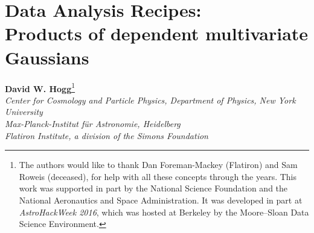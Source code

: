 \newcommand{\given}{\,|\,}
\newcommand{\dd}{\mathrm{d}}
\newcommand{\T}{^{\!\mathsf{T}\!}}
\newcommand{\inv}{^{-1}}
\newcommand{\scalar}[1]{#1}
\renewcommand{\vector}[1]{\boldsymbol{#1}}
\newcommand{\tensor}[1]{\mathbf{#1}}
\renewcommand{\matrix}[1]{\mathsf{#1}}
\newcommand{\normal}{\mathcal{N}\!\,}

\newcommand{\va}{\vector{a}}
\newcommand{\vb}{\vector{b}}
\newcommand{\vm}{\vector{m}}
\newcommand{\vx}{\vector{x}}
\newcommand{\vy}{\vector{y}}
\newcommand{\vz}{\vector{z}}
\newcommand{\vmu}{\vector{\mu}}
\newcommand{\veta}{\vector{\eta}}
\newcommand{\vtheta}{\vector{\theta}}
\newcommand{\tA}{\tensor{A}}
\newcommand{\tB}{\tensor{B}}
\newcommand{\tC}{\tensor{C}}
\newcommand{\tD}{\tensor{D}}
\newcommand{\tI}{\tensor{I}}
\newcommand{\tQ}{\tensor{Q}}
\newcommand{\tS}{\tensor{S}}
\newcommand{\tH}{\tensor{H}}
\newcommand{\tV}{\tensor{V}}
\newcommand{\tLambda}{\tensor{\Lambda}}
\newcommand{\mM}{\matrix{M}}
\newcommand{\mN}{\matrix{N}}
\newcommand{\mU}{\matrix{U}}
\newcommand{\mV}{\matrix{V}}
\newcommand{\bP}{\ensuremath{\textrm{\ding{80}}}} %
\newcommand{\bH}{\ensuremath{\textrm{\ding{114}}}} %

\addtolength{\topmargin}{-0.75in}
\addtolength{\textheight}{1.5in}
\setlength{\parindent}{\baselineskip}
\raggedbottom\sloppy\sloppypar\frenchspacing

\usepackage{color}
\newcommand{\todo}[1]{\textcolor{BrickRed}{[TODO: #1]}}
\newcommand{\bl}[1]{\textcolor{red}{[BL says: #1]}}
\newcommand{\hogg}[1]{\textcolor{magenta}{[Hogg says: #1]}}



\section*{Data Analysis Recipes:\\ Products of dependent multivariate Gaussians}

\noindent\textbf{David W. Hogg}\footnote{%
The authors would like to thank
  Dan Foreman-Mackey (Flatiron) and
  Sam Roweis (deceased),
for help with all these concepts through the years.
This work was supported in part by the National Science Foundation
and the National Aeronautics and Space Administration. It was developed
in part at \textsl{AstroHackWeek 2016}, which was hosted at Berkeley
by the Moore--Sloan Data Science Environment.
}\\
{\footnotesize%
  \textsl{Center for Cosmology and Particle Physics, Department of Physics, New York University}\\
  \textsl{Max-Planck-Institut f\"ur Astronomie, Heidelberg}\\
  \textsl{Flatiron Institute, a division of the Simons Foundation}%
}

